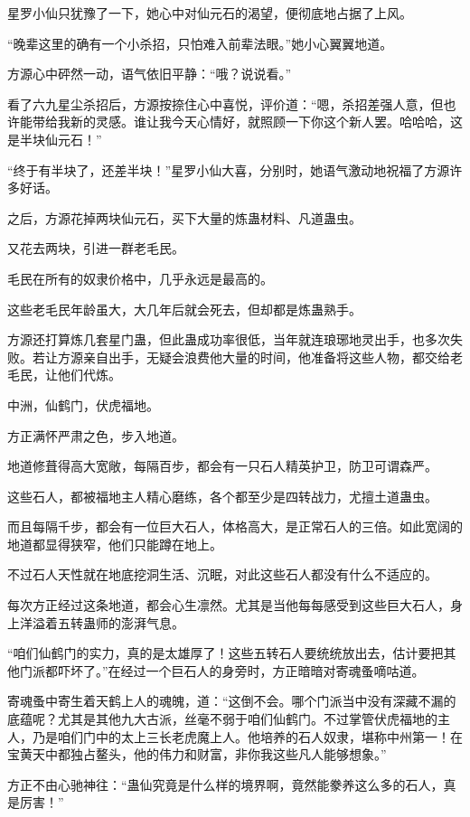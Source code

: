 \begin{this_body}
星罗小仙只犹豫了一下，她心中对仙元石的渴望，便彻底地占据了上风。

“晚辈这里的确有一个小杀招，只怕难入前辈法眼。”她小心翼翼地道。

方源心中砰然一动，语气依旧平静：“哦？说说看。”

看了六九星尘杀招后，方源按捺住心中喜悦，评价道：“嗯，杀招差强人意，但也许能带给我新的灵感。谁让我今天心情好，就照顾一下你这个新人罢。哈哈哈，这是半块仙元石！”

“终于有半块了，还差半块！”星罗小仙大喜，分别时，她语气激动地祝福了方源许多好话。

之后，方源花掉两块仙元石，买下大量的炼蛊材料、凡道蛊虫。

又花去两块，引进一群老毛民。

毛民在所有的奴隶价格中，几乎永远是最高的。

这些老毛民年龄虽大，大几年后就会死去，但却都是炼蛊熟手。

方源还打算炼几套星门蛊，但此蛊成功率很低，当年就连琅琊地灵出手，也多次失败。若让方源亲自出手，无疑会浪费他大量的时间，他准备将这些人物，都交给老毛民，让他们代炼。

中洲，仙鹤门，伏虎福地。

方正满怀严肃之色，步入地道。

地道修葺得高大宽敞，每隔百步，都会有一只石人精英护卫，防卫可谓森严。

这些石人，都被福地主人精心磨练，各个都至少是四转战力，尤擅土道蛊虫。

而且每隔千步，都会有一位巨大石人，体格高大，是正常石人的三倍。如此宽阔的地道都显得狭窄，他们只能蹲在地上。

不过石人天性就在地底挖洞生活、沉眠，对此这些石人都没有什么不适应的。

每次方正经过这条地道，都会心生凛然。尤其是当他每每感受到这些巨大石人，身上洋溢着五转蛊师的澎湃气息。

“咱们仙鹤门的实力，真的是太雄厚了！这些五转石人要统统放出去，估计要把其他门派都吓坏了。”在经过一个巨石人的身旁时，方正暗暗对寄魂蚤嘀咕道。

寄魂蚤中寄生着天鹤上人的魂魄，道：“这倒不会。哪个门派当中没有深藏不漏的底蕴呢？尤其是其他九大古派，丝毫不弱于咱们仙鹤门。不过掌管伏虎福地的主人，乃是咱们门中的太上三长老虎魔上人。他培养的石人奴隶，堪称中州第一！在宝黄天中都独占鳌头，他的伟力和财富，非你我这些凡人能够想象。”

方正不由心驰神往：“蛊仙究竟是什么样的境界啊，竟然能豢养这么多的石人，真是厉害！”


\end{this_body}
